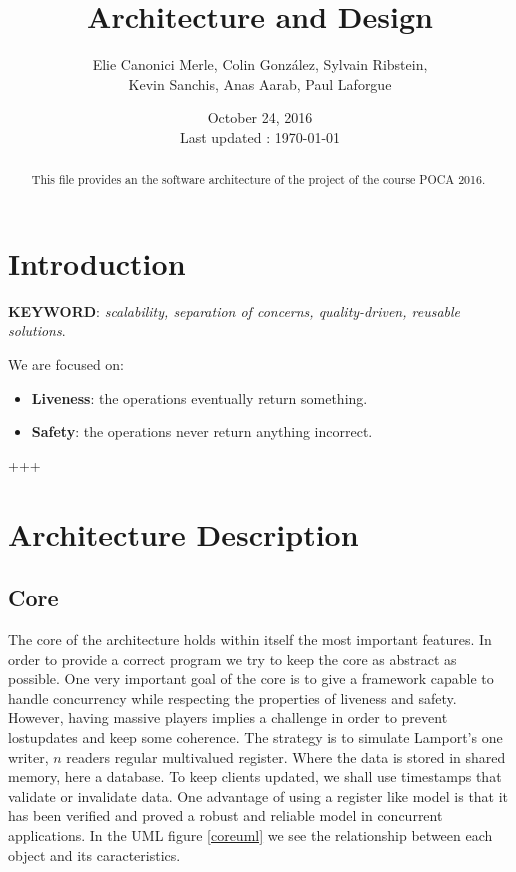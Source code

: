 \documentclass[a4paper,09pt]{article}
\author{Elie Canonici Merle, Colin González, Sylvain Ribstein, \\
  Kevin Sanchis, Anas Aarab, Paul Laforgue}
\title{Architecture and Design}
\date{October 24, 2016 \\ \small Last updated : \today}
\begin{document}
\maketitle

\begin{abstract}
  This file provides an the software architecture of the project of the
  course POCA 2016.
\end{abstract}

\tableofcontents

\section*{Introduction}

\textbf{KEYWORD}:
\textit{scalability, separation of concerns, quality-driven, reusable solutions}.

We are focused on:

\begin{itemize}
\item \textbf{Liveness}: the operations eventually return something.
\item \textbf{Safety}: the operations never return anything incorrect.
\end{itemize}

+++
%   

\section{Architecture Description}

\subsection{Core}
The core of the architecture holds within itself the most important features. In order to provide a correct program we try to keep the core as abstract as possible. One very important goal of the core is to give a framework capable to handle concurrency while respecting the properties of liveness and safety. However, having massive players implies a challenge in order to prevent lostupdates and keep some coherence. The strategy is to simulate Lamport's one writer, $n$ readers regular multivalued register. Where the data is stored in shared memory, here a database. To keep clients updated, we shall use timestamps that validate or invalidate data. One advantage of using a register like model is that it has been verified and proved a robust and reliable model in concurrent applications. In the UML figure \ref{coreuml} we see the relationship between each object and its caracteristics.\\
\end{document}
